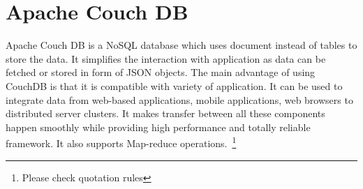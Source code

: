 \section{Apache Couch DB}

Apache Couch DB is a NoSQL database which uses document instead of tables to
store the data. It simplifies the interaction with application as data can be
fetched or stored in form of JSON objects.
The main advantage of using CouchDB is that it is compatible with variety of
application. It can be used to integrate data from web-based applications,
mobile applications, web browsers to distributed server clusters. It makes
transfer between all these components happen smoothly while providing high
performance and totally reliable framework. It also supports Map-reduce
operations.~\cite{hid-sp18-502-ApacheCouchDB}\footnote{Please check quotation rules}
